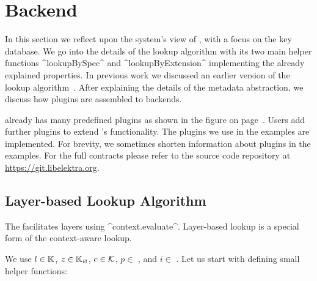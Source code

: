 \section{Backend}
\label{sec:kdb}


In this section we reflect upon the system's view of \elektra{}, with a focus on the key database.
We go into the details of the lookup algorithm with its two main helper functions ^lookupBySpec^ and ^lookupByExtension^ implementing the already explained properties.
In previous work we discussed an earlier version of the lookup algorithm~\cite{raab2015kps}.
After explaining the details of the metadata abstraction, we discuss how plugins are assembled to backends.

\elektra{} already has many predefined plugins as shown in the figure on page~\pageref{fig:plugins}.
Users add further plugins to extend \elektra{}'s functionality.
The plugins we use in the examples are implemented.
For brevity, we sometimes shorten information about plugins in the examples.
For the full contracts please refer to the source code repository at \url{https://git.libelektra.org}.

\subsection{Layer-based Lookup Algorithm}

The  facilitates layers using ^context.evaluate^.
Layer-based lookup is a special form of the context-aware lookup.

We use $l \in \mathbb{K}$, $z \in \mathbb{K}_\varnothing$, $c \in \mathcal{K}$, $p \in$ , and $i \in$ .
Let us start with defining small helper functions:

